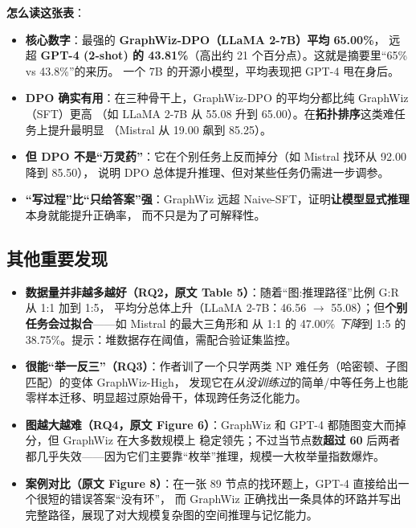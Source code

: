 \documentclass[11pt,UTF8,fontset=fandol]{ctexart}
\begin{document}
\textbf{怎么读这张表}：
\begin{itemize}[leftmargin=2em]
  \item \textbf{核心数字}：最强的 \textbf{GraphWiz-DPO（LLaMA 2-7B）平均 65.00\%}，
        远超 \textbf{GPT-4 (2-shot) 的 43.81\%}（高出约 21 个百分点）。这就是摘要里“65\% vs 43.8\%”的来历。
        一个 7B 的开源小模型，平均表现把 GPT-4 甩在身后。
  \item \textbf{DPO 确实有用}：在三种骨干上，GraphWiz-DPO 的平均分都比纯 GraphWiz（SFT）更高
        （如 LLaMA 2-7B 从 55.08 升到 65.00）。在\textbf{拓扑排序}这类难任务上提升最明显
        （Mistral 从 19.00 飙到 85.25）。
  \item \textbf{但 DPO 不是“万灵药”}：它在个别任务上反而掉分（如 Mistral 找环从 92.00 降到 85.50），
        说明 DPO 总体提升推理、但对某些任务仍需进一步调参。
  \item \textbf{“写过程”比“只给答案”强}：GraphWiz 远超 Naive-SFT，证明\textbf{让模型显式推理}本身就能提升正确率，
        而不只是为了可解释性。
\end{itemize}

\subsection{其他重要发现}
\begin{itemize}[leftmargin=2em]
  \item \textbf{数据量并非越多越好（RQ2，原文 Table 5）}：随着“图:推理路径”比例 G:R 从 1:1 加到 1:5，
        平均分总体上升（LLaMA 2-7B：46.56 $\to$ 55.08）；但\textbf{个别任务会过拟合}——如 Mistral 的最大三角形和
        从 1:1 的 47.00\% \emph{下降}到 1:5 的 38.75\%。提示：堆数据存在阈值，需配合验证集监控。
  \item \textbf{很能“举一反三”（RQ3）}：作者训了一个只学两类 NP 难任务（哈密顿、子图匹配）的变体 GraphWiz-High，
        发现它在\emph{从没训练过}的简单/中等任务上也能零样本迁移、明显超过原始骨干，体现跨任务泛化能力。
  \item \textbf{图越大越难（RQ4，原文 Figure 6）}：GraphWiz 和 GPT-4 都随图变大而掉分，但 GraphWiz 在大多数规模上
        稳定领先；不过当节点数\textbf{超过 60} 后两者都几乎失效——因为它们主要靠“枚举”推理，规模一大枚举量指数爆炸。
  \item \textbf{案例对比（原文 Figure 8）}：在一张 89 节点的找环题上，GPT-4 直接给出一个很短的错误答案“没有环”，
        而 GraphWiz 正确找出一条具体的环路并写出完整路径，展现了对大规模复杂图的空间推理与记忆能力。
\end{itemize}
\end{document}

